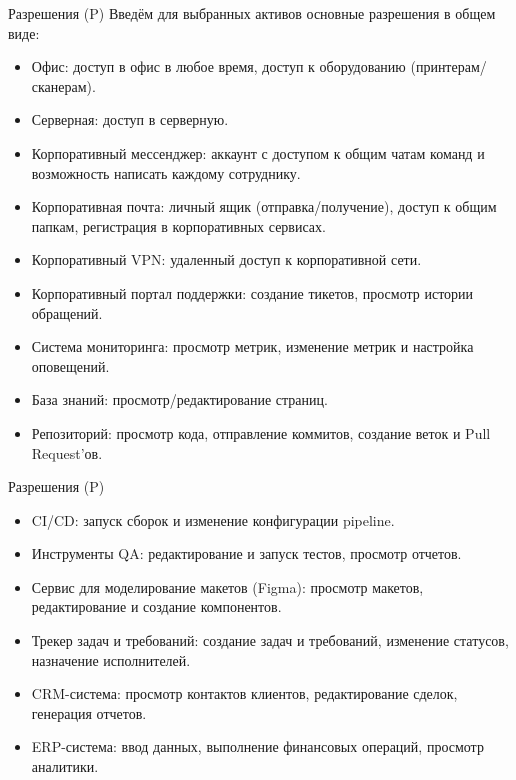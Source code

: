 \documentclass[10pt]{beamer}
\begin{document}
\begin{frame}{Разрешения (P)}
    Введём для выбранных активов основные разрешения в общем виде:
    \begin{itemize}
        \item Офис: доступ в офис в любое время, доступ к оборудованию (принтерам/сканерам).
        \item Серверная: доступ в серверную.
        \item Корпоративный мессенджер: аккаунт с доступом к общим чатам команд и возможность написать каждому сотруднику.
        \item Корпоративная почта: личный ящик (отправка/получение), доступ к общим папкам, регистрация в корпоративных сервисах.
        \item Корпоративный VPN: удаленный доступ к корпоративной сети.
        \item Корпоративный портал поддержки: создание тикетов, просмотр истории обращений.
        \item Система мониторинга: просмотр метрик, изменение метрик и настройка оповещений.
        \item База знаний: просмотр/редактирование страниц.
        \item Репозиторий: просмотр кода, отправление коммитов, создание веток и Pull Request'ов.
    \end{itemize}
\end{frame}

\begin{frame}{Разрешения (P)}
    \begin{itemize}
        \item CI/CD: запуск сборок и изменение конфигурации pipeline.
        \item Инструменты QA: редактирование и запуск тестов, просмотр отчетов.
        \item Сервис для моделирование макетов (Figma): просмотр макетов, редактирование и создание компонентов.
        \item Трекер задач и требований: создание задач и требований, изменение статусов, назначение исполнителей.
        \item CRM-система: просмотр контактов клиентов, редактирование сделок, генерация отчетов.
        \item ERP-система: ввод данных, выполнение финансовых операций, просмотр аналитики.
    \end{itemize}
\end{frame}
\end{document}

